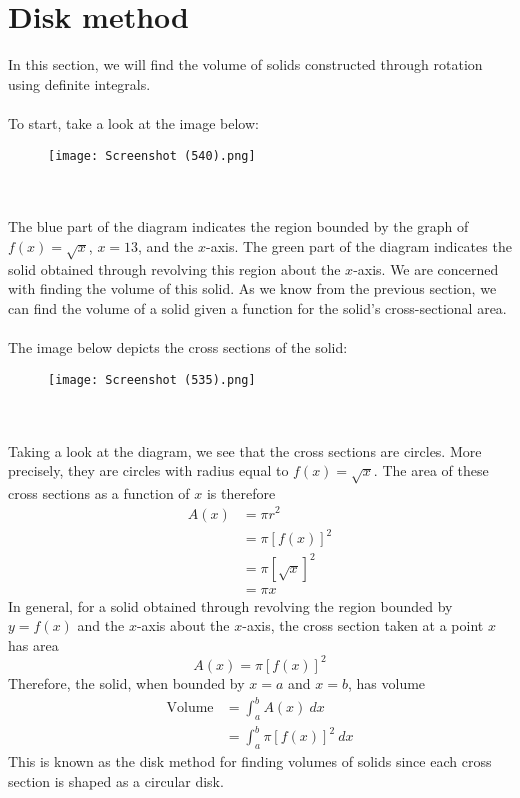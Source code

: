 \documentclass[11pt]{scrartcl}
\begin{document}
\maketitle
\noindent
\section{Disk method}

In this section, we will find the volume of solids constructed through rotation using definite integrals. \\
\\
\noindent 
To start, take a look at the image below: 
\begin{figure}[htp]
    \centering
    \texttt{[image: Screenshot (540).png]}
\end{figure} \\
\\
\noindent 
The blue part of the diagram indicates the region bounded by the graph of $f(x)=\sqrt{x}$, $x=13$, and the $x$-axis. The green part of the diagram indicates the solid obtained through revolving this region about the $x$-axis. We are concerned with finding the volume of this solid. As we know from the previous section, we can find the volume of a solid given a function for the solid's cross-sectional area. \\
\\
\noindent 
The image below depicts the cross sections of the solid: 
\newpage
\begin{figure}[htp]
    \centering
    \texttt{[image: Screenshot (535).png]}
\end{figure}
\\
\\
\noindent 
Taking a look at the diagram, we see that the cross sections are circles. More precisely, they are circles with radius equal to $f(x)=\sqrt{x}$. The area of these cross sections as a function of $x$ is therefore 
\begin{align*}
    A(x) &= \pi r^2 \\
         &= \pi[f(x)]^2 \\
         &= \pi[\sqrt{x}]^2 \\
         &= \pi x
\end{align*}
\noindent
In general, for a solid obtained through revolving the region bounded by $y=f(x)$ and the $x$-axis about the $x$-axis, the cross section taken at a point $x$ has area 
$$A(x)=\pi[f(x)]^2$$
\noindent 
Therefore, the solid, when bounded by $x=a$ and $x=b$, has volume 
\begin{align*}
    \text{Volume} &=\int_a^b{A(x) \ dx} \\
                  &=\int_a^b{\pi[f(x)]^2 \ dx}
\end{align*}
\noindent 
This is known as the disk method for finding volumes of solids since each cross section is shaped as a circular disk.
\end{document}
